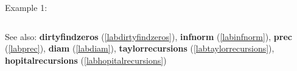 \noindent Example 1: 
\begin{center}\begin{minipage}{15cm}\begin{Verbatim}[frame=single]
\end{Verbatim}
\end{minipage}\end{center}
See also: \textbf{dirtyfindzeros} (\ref{labdirtyfindzeros}), \textbf{infnorm} (\ref{labinfnorm}), \textbf{prec} (\ref{labprec}), \textbf{diam} (\ref{labdiam}), \textbf{taylorrecursions} (\ref{labtaylorrecursions}), \textbf{hopitalrecursions} (\ref{labhopitalrecursions})
